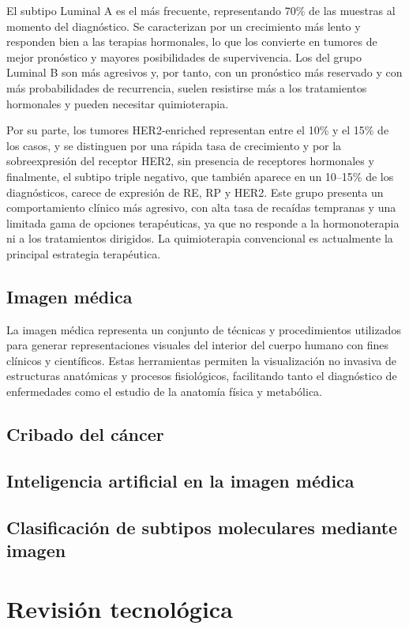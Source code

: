 \documentclass[a4paper,10pt]{book}
\begin{document}
El subtipo Luminal A es el más frecuente, representando 70\% de las muestras al momento del diagnóstico. Se caracterizan por un crecimiento más lento y responden bien a las terapias hormonales, lo que los convierte en tumores de mejor pronóstico y mayores posibilidades de supervivencia. Los del grupo Luminal B son más agresivos y, por tanto, con un pronóstico más reservado y con más probabilidades de recurrencia, suelen resistirse más a los tratamientos hormonales y pueden necesitar quimioterapia. 

Por su parte, los tumores HER2-enriched representan entre el 10\% y el 15\% de los casos, y se distinguen por una rápida tasa de crecimiento y por la sobreexpresión del receptor HER2, sin presencia de receptores hormonales y finalmente, el subtipo triple negativo, que también aparece en un 10–15\% de los diagnósticos, carece de expresión de RE, RP y HER2. Este grupo presenta un comportamiento clínico más agresivo, con alta tasa de recaídas tempranas y una limitada gama de opciones terapéuticas, ya que no responde a la hormonoterapia ni a los tratamientos dirigidos. La quimioterapia convencional es actualmente la principal estrategia terapéutica.

\section{Imagen médica}

La imagen médica representa un conjunto de técnicas y procedimientos utilizados para generar representaciones visuales del interior del cuerpo humano con fines clínicos y científicos. Estas herramientas permiten la visualización no invasiva de estructuras anatómicas y procesos fisiológicos, facilitando tanto el diagnóstico de enfermedades como el estudio de la anatomía física y metabólica.

\section{Cribado del cáncer}
\section{Inteligencia artificial en la imagen médica}
\section{Clasificación de subtipos moleculares mediante imagen}

\chapter{Revisión tecnológica}
\end{document}
